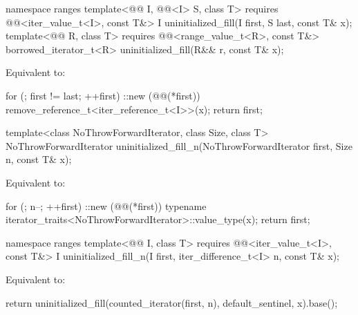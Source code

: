 %
\begin{itemdecl}
namespace ranges {
  template<@@ I, @@<I> S, class T>
    requires @@<iter_value_t<I>, const T&>
    I uninitialized_fill(I first, S last, const T& x);
  template<@@ R, class T>
    requires @@<range_value_t<R>, const T&>
    borrowed_iterator_t<R> uninitialized_fill(R&& r, const T& x);
}
\end{itemdecl}

\begin{itemdescr}
\pnum
\effects
Equivalent to:
\begin{codeblock}
for (; first != last; ++first)
  ::new (@@(*first)) remove_reference_t<iter_reference_t<I>>(x);
return first;
\end{codeblock}
\end{itemdescr}

%
\begin{itemdecl}
template<class NoThrowForwardIterator, class Size, class T>
  NoThrowForwardIterator uninitialized_fill_n(NoThrowForwardIterator first, Size n, const T& x);
\end{itemdecl}

\begin{itemdescr}
\pnum
\effects
Equivalent to:
\begin{codeblock}
for (; n--; ++first)
  ::new (@@(*first))
    typename iterator_traits<NoThrowForwardIterator>::value_type(x);
return first;
\end{codeblock}
\end{itemdescr}

%
\begin{itemdecl}
namespace ranges {
  template<@@ I, class T>
    requires @@<iter_value_t<I>, const T&>
    I uninitialized_fill_n(I first, iter_difference_t<I> n, const T& x);
}
\end{itemdecl}

\begin{itemdescr}
\pnum
\effects
Equivalent to:
\begin{codeblock}
return uninitialized_fill(counted_iterator(first, n), default_sentinel, x).base();
\end{codeblock}
\end{itemdescr}


